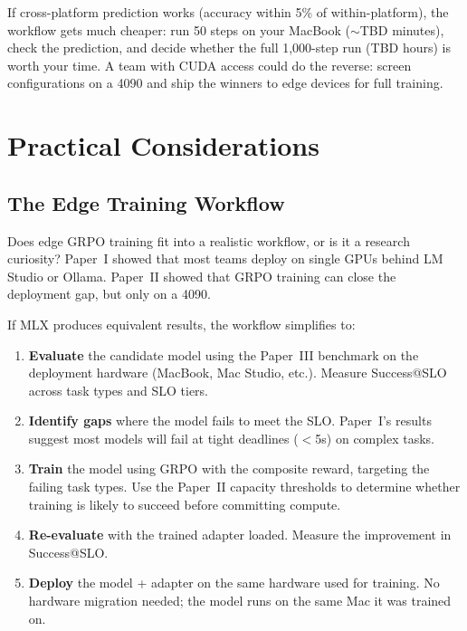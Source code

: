 \documentclass[11pt]{article}
\begin{document}
If cross-platform prediction works (accuracy within 5\% of within-platform), the workflow gets much cheaper: run 50 steps on your MacBook ($\sim$TBD minutes), check the prediction, and decide whether the full 1{,}000-step run (TBD hours) is worth your time.  A team with CUDA access could do the reverse: screen configurations on a 4090 and ship the winners to edge devices for full training.


\section{Practical Considerations}

\subsection{The Edge Training Workflow}
\label{sec:workflow}

Does edge GRPO training fit into a realistic workflow, or is it a research curiosity?  Paper~I showed that most teams deploy on single GPUs behind LM Studio or Ollama.  Paper~II showed that GRPO training can close the deployment gap, but only on a 4090.

If MLX produces equivalent results, the workflow simplifies to:

\begin{enumerate}[leftmargin=12pt]
    \item \textbf{Evaluate} the candidate model using the Paper~III benchmark on the deployment hardware (MacBook, Mac Studio, etc.).  Measure Success@SLO across task types and SLO tiers.
    \item \textbf{Identify gaps} where the model fails to meet the SLO.  Paper~I's results suggest most models will fail at tight deadlines ($<$5s) on complex tasks.
    \item \textbf{Train} the model using GRPO with the composite reward, targeting the failing task types.  Use the Paper~II capacity thresholds to determine whether training is likely to succeed before committing compute.
    \item \textbf{Re-evaluate} with the trained adapter loaded.  Measure the improvement in Success@SLO.
    \item \textbf{Deploy} the model + adapter on the same hardware used for training.  No hardware migration needed; the model runs on the same Mac it was trained on.
\end{enumerate}
\end{document}
